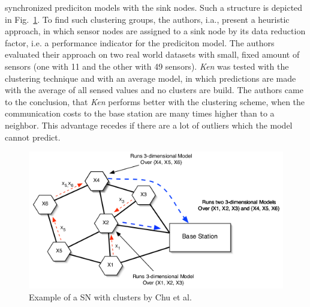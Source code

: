 synchronized prediciton models with the sink nodes. Such a structure is
depicted in Fig.~\ref{fig:cluster Chu}. To find such clustering groups, the
authors, i.a., present a heuristic approach, in which sensor nodes are assigned
to a sink node by its data reduction factor, i.e. a performance indicator for
the prediciton model. The authors evaluated their approach on two real world
datasets with small, fixed amount of sensors (one with 11 and the other with 49
sensors). \textit{Ken} was tested with the clustering technique and with an
average model, in which predictions are made with the average of all sensed
values and no clusters are build. The authors came to the conclusion, that
\textit{Ken} performs better with the clustering scheme, when the communication
costs to the base station are many times higher than to a neighbor. This
advantage recedes if there are a lot of outliers which the model cannot
predict.

\begin{figure}[h]
\includegraphics[width=\linewidth]{images/ken-clustering.png}
\caption{Example of a \ac{SN} with clusters by Chu et al.~\cite{chu2006approximate}}
\label{fig:cluster Chu}
\centering
\end{figure}

